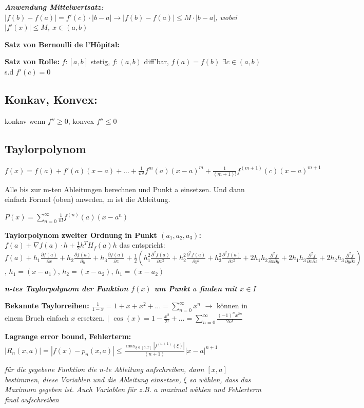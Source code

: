 \documentclass[a3paper, ngerman, 8pt]{article}
\begin{document}
\begin{multicols*}{3}
\textit{\textbf{Anwendung Mittelwertsatz:} $|f(b)-f(a)|=f'(c)\cdot |b-a| \to
|f(b)-f(a)|\leq M \cdot |b-a|$, wobei $|f'(x)|\leq M $, $x \in (a,b)$}

\textbf{Satz von Bernoulli de l'Hôpital:}

\textbf{Satz von Rolle:} $f: [a,b]$ stetig, $f:(a,b)$ diff'bar, $f(a)=f(b)$ $\exists c \in (a,b)$ s.d $f'(c)=0$

\subsection*{Konkav, Konvex:} konkav wenn $f''\geq0$, konvex $f''\leq 0$

\subsection*{Taylorpolynom}
$f(x)=f(a)+f'(a)(x-a)+...+\frac{1}{m!}f^{m}(a)(x-a)^m+\frac{1}{(m+1)!}f^{(m+1)}(c)(x-a)^{m+1}$

Alle bis zur m-ten Ableitungen berechnen und Punkt a einsetzen. Und dann einfach Formel (oben) anweden, m ist die Ableitung. 

$P(x)=\sum_{n=0}^{\infty}\frac{1}{n!}f^{(n)}(a)(x-a^n)$

\textbf{Taylorpolynom zweiter Ordnung in Punkt $(a_1, a_2, a_3)$:} $f(a) + \nabla f(a)\cdot h + \frac{1}{2}h^TH_f(a)h$ das entspricht: $f(a) + h_1 \frac{\partial f(a)}{\partial x}+h_2\frac{\partial f(a)}{\partial y}+h_3\frac{\partial f(a)}{\partial z}+\frac{1}{2}(h_1^2\frac{\partial^2 f(a)}{\partial x^2}+h_2^2\frac{\partial^2 f(a)}{\partial y^2}+h_3^2\frac{\partial^2 f(a)}{\partial z^2}+2h_1h_2\frac{\partial ^2 f}{\partial x \partial y}+2h_1h_3\frac{\partial ^2 f}{\partial x \partial z}+2h_2h_3\frac{\partial ^2 f}{\partial y \partial z})$, $h_1=(x-a_1)$, $h_2=(x-a_2)$, $h_1=(x-a_2)$

\textit{\textbf{n-tes Taylorpolynom der Funktion $f(x)$ um Punkt $a$ finden mit $x \in I$}}

\textbf{Bekannte Taylorreihen:}
$\frac{1}{1-x}=1+x+x^2+...=\sum_{n=0}^{\infty}x^n$ $\to$ können in einem Bruch
einfach $x$ ersetzen. $\big \vert$ $\cos(x)=1-\frac{x^2}{2!}+...=
\sum_{n=0}^{\infty}\frac{(-1)^n x^{2n}}{2n!}$

\textbf{Lagrange error bound, Fehlerterm:} $|R_n(x,a)| = |f(x)-p_n(x,a)|\leq
\frac{\max_{\xi \in [a,x]}|f^{{(n+1)}}(\xi)|}{(n+1)\!}|x-a|^{n+1}$

\textit{für die gegebene Funktion die n-te Ableitung aufschreiben, dann $[x, a]$ 
bestimmen, diese Variablen und die Ableitung einsetzen, $\xi$ so wählen, dass 
das Maximum gegeben ist. Auch Variablen für z.B. $a$ maximal wählen und 
Fehlerterm final aufschreiben}


\end{multicols*}
\end{document}
